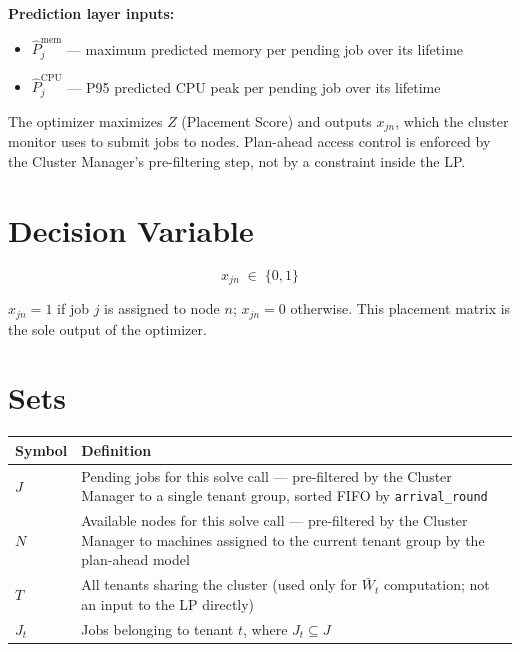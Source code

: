 \documentclass[11pt]{article}
\newcommand{\Pmem}{\hat{P}_j^{\text{mem}}}
\newcommand{\Pcpu}{\hat{P}_j^{\text{CPU}}}
\begin{document}
\medskip
\noindent\textbf{Prediction layer inputs:}
\begin{itemize}[noitemsep, topsep=2pt]
  \item $\Pmem$ --- maximum predicted memory per pending job over its lifetime
  \item $\Pcpu$ --- P95 predicted CPU peak per pending job over its lifetime
\end{itemize}

\medskip
The optimizer maximizes $Z$ (Placement Score) and outputs $x_{jn}$, which
the cluster monitor uses to submit jobs to nodes. Plan-ahead access control is
enforced by the Cluster Manager's pre-filtering step, not by a constraint inside
the LP.

\section{Decision Variable}

\[
  x_{jn} \;\in\; \{0,1\}
\]

$x_{jn} = 1$ if job $j$ is assigned to node $n$; $x_{jn} = 0$ otherwise.
This placement matrix is the sole output of the optimizer.

\section{Sets}

\begin{center}
\begin{tabular}{@{}l p{10.5cm}@{}}
\toprule
Symbol & Definition \\
\midrule
$J$   & Pending jobs for this solve call --- pre-filtered by the Cluster Manager
        to a single tenant group, sorted FIFO by \texttt{arrival\_round} \\[3pt]
$N$   & Available nodes for this solve call --- pre-filtered by the Cluster Manager
        to machines assigned to the current tenant group by the plan-ahead model \\[3pt]
$T$   & All tenants sharing the cluster (used only for $\bar{W}_t$ computation;
        not an input to the LP directly) \\[3pt]
$J_t$ & Jobs belonging to tenant $t$, where $J_t \subseteq J$ \\
\bottomrule
\end{tabular}
\end{center}
\end{document}
